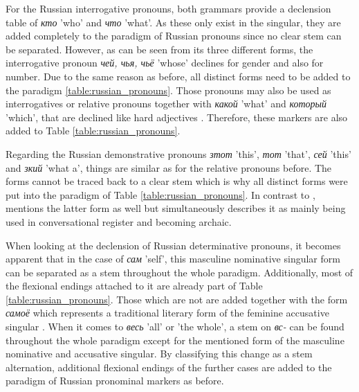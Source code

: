 \documentclass[11pt,a4paper,twoside,openright]{scrbook}
\begin{document}
For the Russian interrogative pronouns, both grammars provide a declension table of \foreignlanguage{russian}{\textit{кто}} 'who' and \foreignlanguage{russian}{\textit{что}} 'what'. As these only exist in the singular, they are added completely to the paradigm of Russian pronouns since no clear stem can be separated. However, as can be seen from its three different forms, the interrogative pronoun \foreignlanguage{russian}{\textit{чей, чья, чьё}} 'whose' declines for gender and also for number. Due to the same reason as before, all distinct forms need to be added to the paradigm \ref{table:russian_pronouns}. Those pronouns may also be used as interrogatives or relative pronouns together with \foreignlanguage{russian}{\textit{какой}} 'what' and \foreignlanguage{russian}{\textit{который}} 'which', that are declined like hard adjectives \citep{kohls2009russ}. Therefore, these markers are also added to Table \ref{table:russian_pronouns}.

Regarding the Russian demonstrative pronouns \foreignlanguage{russian}{\textit{зтот}} 'this', \foreignlanguage{russian}{\textit{тот}} 'that', \foreignlanguage{russian}{\textit{сей}} 'this' and \foreignlanguage{russian}{\textit{зкий}} 'what a', things are similar as for the relative pronouns before. The forms cannot be traced back to a clear stem which is why all distinct forms were put into the paradigm of Table \ref{table:russian_pronouns}. In contrast to \citet{kohls2009russ}, \citet{wade2020russ} mentions the latter form as well but simultaneously describes it as mainly being  used in conversational register and becoming archaic.

When looking at the declension of Russian determinative pronouns, it becomes apparent that in the case of \foreignlanguage{russian}{\textit{сам}} 'self', this masculine nominative singular form can be separated as a stem throughout the whole paradigm. Additionally, most of the flexional endings attached to it are already part of Table \ref{table:russian_pronouns}. Those which are not are added together with the form \foreignlanguage{russian}{\textit{самоё}} which represents a traditional literary form of the feminine accusative singular \citep{wade2020russ}. When it comes to \foreignlanguage{russian}{\textit{весь}} 'all' or 'the whole', a stem on \foreignlanguage{russian}{\textit{вс-}} can be found throughout the whole paradigm except for the mentioned form of the masculine nominative and accusative singular. By classifying this change as a stem alternation, additional flexional endings of the further cases are added to the paradigm of Russian pronominal markers as before. 
\end{document}
